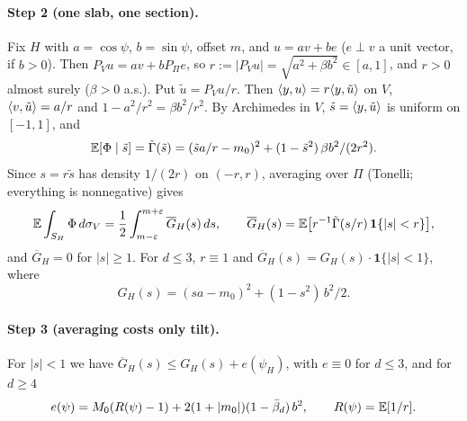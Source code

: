 \documentclass[11pt]{article}
\newcommand{\Abb}{\bar\beta}
\newcommand{\Aone}{\mathbf{1}}
\begin{document}
\paragraph{Step 2 (one slab, one section).} Fix $H$ with $a = \cos\psi$, $b = \sin\psi$, offset
$m$, and $u = av + be$ ($e \perp v$ a unit vector, if $b > 0$). Then $P_V u = av + b P_\Pi e$, so
$r := |P_V u| = \sqrt{a^2 + \beta b^2} \in [a, 1]$, and $r > 0$ almost surely ($\beta > 0$ a.s.).
Put $\tilde u = P_V u / r$. Then
$\langle y,u\rangle = r \langle y,\tilde u\rangle$ on $V$, $\langle v,\tilde u\rangle = a/r$ and
$1 - a^2/r^2 = \beta b^2/r^2$. By Archimedes in $V$, $\tilde s = \langle y,\tilde u\rangle$ is uniform on
$[-1, 1]$, and
\begin{equation*}
  \mathbb{E}[\Phi \mid \tilde s] = \tilde\Gamma(\tilde s)
    = (\tilde s a/r - m_0)^2 + (1 - \tilde s^2)\, \beta b^2/(2r^2).
\end{equation*}
Since $s = r\tilde s$ has density $1/(2r)$ on $(-r, r)$, averaging over $\Pi$ (Tonelli; everything is
nonnegative) gives
\begin{equation*}
  \E \int_{S_H} \Phi \, d\sigma_V = \frac12 \int_{m-\eps}^{m+\eps} \overline G_H(s) \, ds, \qquad
  \overline G_H(s) = \E\bigl[r^{-1} \tilde\Gamma(s/r)\, \Aone\{|s| < r\}\bigr],
\end{equation*}
and $\overline G_H = 0$ for $|s| \ge 1$. For $d \le 3$, $r \equiv 1$ and
$\overline G_H(s) = G_H(s) \cdot \Aone\{|s| < 1\}$, where
\begin{equation*}
  G_H(s) = (sa - m_0)^2 + (1 - s^2)\, b^2/2.
\end{equation*}

\paragraph{Step 3 (averaging costs only tilt).} For $|s| < 1$ we have
$\overline G_H(s) \le G_H(s) + e(\psi_H)$, with $e \equiv 0$ for $d \le 3$, and for $d \ge 4$
\begin{equation*}
  e(\psi) = M_0(R(\psi) - 1) + 2(1 + |m_0|)(1 - \Abb_d)\, b^2, \qquad R(\psi) = \E[1/r].
\end{equation*}
\end{document}

